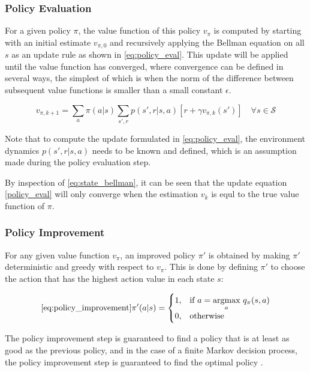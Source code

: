 \documentclass[../report.tex]{subfiles}
\begin{document}
\subsubsection{Policy Evaluation}

For a given policy $\pi$, the value function of this policy $v_{\pi}$ is computed by starting with an initial estimate $v_{\pi, 0}$ and recursively applying the Bellman equation on all $s$ as an update rule as shown in \autoref{eq:policy_eval}. This update will be applied until the value function has converged, where convergence can be defined in several ways, the simplest of which is when the norm of the difference between subsequent value functions is smaller than a small constant $\epsilon$.

\begin{equation}\label{eq:policy_eval}
    v_{\pi, k+1}= \sum\limits_{a}\pi(a|s) \sum\limits_{s', r} p(s', r|s, a)[r + \gamma v_{\pi, k}(s')] \quad \forall s \in \mathcal{S}
\end{equation}

Note that to compute the update formulated in \autoref{eq:policy_eval}, the environment dynamics $p(s',r|s,a)$ needs to be known and defined, which is an assumption made during the policy evaluation step.

By inspection of \autoref{eq:state_bellman}, it can be seen that the update equation \autoref{policy_eval} will only converge when the estimation $v_k$  is equl to the true value function of $\pi$.

\subsubsection{Policy Improvement}

For any given value function $v_{\pi}$, an improved policy $\pi'$ is obtained by making $\pi'$ deterministic and greedy with respect to $v_{\pi}$. This is done by defining $\pi'$ to choose the action that has the highest action value in each state $s$:

{\myfont
\begin{equation}\autoref{eq:policy_improvement}
    \pi'(a|s) = \begin{cases}
    1,& \text{if } a = \underset{a}{\text{argmax}} \ q_{\pi}(s,a) \\
    0,              & \text{otherwise}
\end{cases}
\end{equation}
}

The policy improvement step is guaranteed to find a policy that is at least as good as the previous policy, and in the case of a finite Markov decision process, the policy improvement step is guaranteed to find the optimal policy \cite{dp}.
\end{document}
